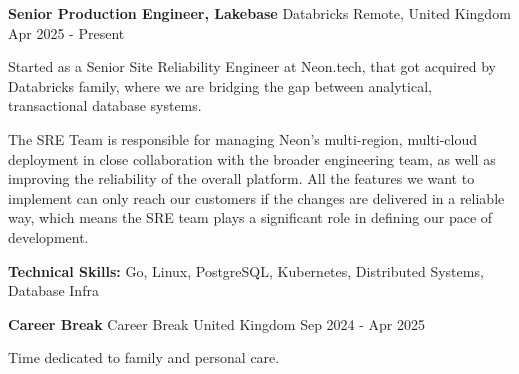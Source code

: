 

\begin{cventries}

	\cventry
	{\textbf{Senior Production Engineer, Lakebase}} %
	{Databricks} %
	{Remote, United Kingdom} %
	{Apr 2025 - Present} %
	{
		\begin{cvitems} %
			\item{Started as a Senior Site Reliability Engineer
			            at Neon.tech, that got acquired by Databricks family, where we are bridging the gap between
			            analytical, transactional database systems.}
			\item {The SRE Team is responsible for managing Neon’s multi-region, multi-cloud deployment in close
			            collaboration with the broader engineering team, as well as improving the reliability of the overall
			            platform. All the features we want to implement can only reach our customers if the changes are
			            delivered in a reliable way, which means the SRE team plays a significant role in defining our pace of
			            development.}
			\item {\textbf{Technical Skills:} Go, Linux, PostgreSQL, Kubernetes, Distributed Systems, Database Infra}
		\end{cvitems}
	}

	\cventry
	{\textbf{Career Break}} %
	{Career Break} %
	{United Kingdom} %
	{Sep 2024 - Apr 2025} %
	{
		\begin{cvitems} %
			\item {Time dedicated to family and personal care.}
		\end{cvitems}
	}


\end{cventries}
